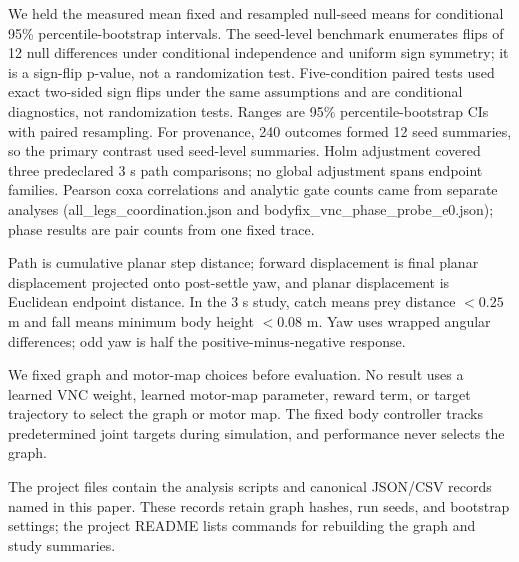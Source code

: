 \documentclass[10pt]{article}
\begin{document}
We held the measured mean fixed and resampled null-seed means for conditional 95\% percentile-bootstrap intervals. The seed-level benchmark enumerates flips of 12 null differences under conditional independence and uniform sign symmetry; it is a sign-flip p-value, not a randomization test. Five-condition paired tests used exact two-sided sign flips under the same assumptions and are conditional diagnostics, not randomization tests. Ranges are 95\% percentile-bootstrap CIs with paired resampling. For provenance, 240 outcomes formed 12 seed summaries, so the primary contrast used seed-level summaries. Holm adjustment covered three predeclared 3 s path comparisons; no global adjustment spans endpoint families. Pearson coxa correlations and analytic gate counts came from separate analyses (all\_legs\_coordination.json and bodyfix\_vnc\_phase\_probe\_e0.json); phase results are pair counts from one fixed trace.

Path is cumulative planar step distance; forward displacement is final planar displacement projected onto post-settle yaw, and planar displacement is Euclidean endpoint distance. In the 3 s study, catch means prey distance $<0.25$ m and fall means minimum body height $<0.08$ m. Yaw uses wrapped angular differences; odd yaw is half the positive-minus-negative response.

We fixed graph and motor-map choices before evaluation. No result uses a learned VNC weight, learned motor-map parameter, reward term, or target trajectory to select the graph or motor map. The fixed body controller tracks predetermined joint targets during simulation, and performance never selects the graph.

The project files contain the analysis scripts and canonical JSON/CSV records named in this paper. These records retain graph hashes, run seeds, and bootstrap settings; the project README lists commands for rebuilding the graph and study summaries.




\end{document}
